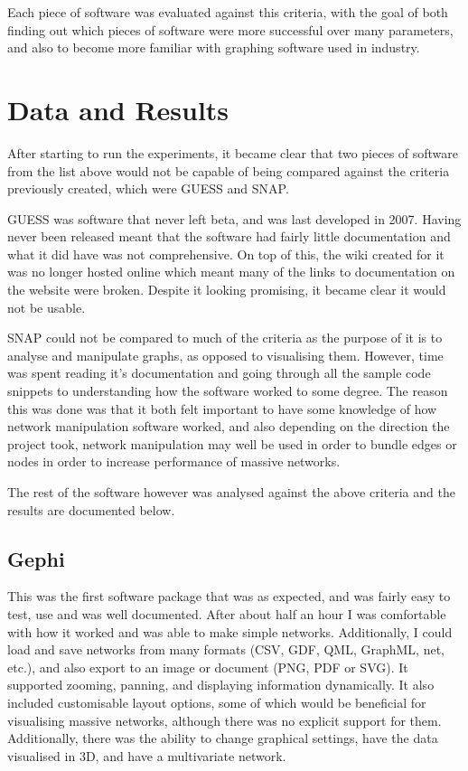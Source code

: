 \documentclass[../dissertation.tex]{subfiles}
\begin{document}
Each piece of software was evaluated against this criteria, with the goal of both finding out which pieces of software were more successful over many parameters, and also to become more familiar with graphing software used in industry.

\section{Data and Results}

After starting to run the experiments, it became clear that two pieces of software from the list above would not be capable of being compared against the criteria previously created, which were GUESS and SNAP.

GUESS was software that never left beta, and was last developed in 2007. Having never been released meant that the software had fairly little documentation and what it did have was not comprehensive. On top of this, the wiki created for it was no longer hosted online which meant many of the links to documentation on the website were broken. Despite it looking promising, it became clear it would not be usable.

SNAP could not be compared to much of the criteria as the purpose of it is to analyse and manipulate graphs, as opposed to visualising them. However, time was spent reading it’s documentation and going through all the sample code snippets to understanding how the software worked to some degree. The reason this was done was that it both felt important to have some knowledge of how network manipulation software worked, and also depending on the direction the project took, network manipulation may well be used in order to bundle edges or nodes in order to increase performance of massive networks.

The rest of the software however was analysed against the above criteria and the results are documented below.

\subsection{Gephi}

This was the first software package that was as expected, and was fairly easy to test, use and was well documented. After about half an hour I was comfortable with how it worked and was able to make simple networks. Additionally, I could load and save networks from many formats (CSV, GDF, QML, GraphML, net, etc.), and also export to an image or document (PNG, PDF or SVG). It supported zooming, panning, and displaying information dynamically. It also included customisable layout options, some of which would be beneficial for visualising massive networks, although there was no explicit support for them. Additionally, there was the ability to change graphical settings, have the data visualised in 3D, and have a multivariate network.
\end{document}
